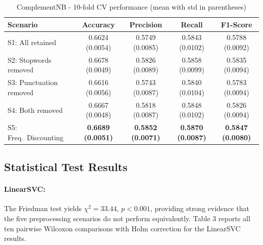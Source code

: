 \documentclass[a4paper,10pt]{article}
\begin{document}
\begin{table}[H]
\centering
\label{tab:nb_cv_results}
\begin{tabular}{|p{5.2cm}|c|c|c|c|}
\hline
\textbf{Scenario} & \textbf{Accuracy} & \textbf{Precision} & \textbf{Recall} & \textbf{F1-Score} \\
\hline
S1: All retained          & 0.6624 (0.0054) & 0.5749 (0.0085) & 0.5843 (0.0102) & 0.5788 (0.0092) \\
\hline
S2: Stopwords removed     & 0.6678 (0.0049) & 0.5826 (0.0089) & 0.5858 (0.0099) & 0.5835 (0.0094) \\
\hline
S3: Punctuation removed   & 0.6616 (0.0056) & 0.5743 (0.0087) & 0.5840 (0.0104) & 0.5783 (0.0094) \\
\hline
S4: Both removed          & 0.6667 (0.0048) & 0.5818 (0.0087) & 0.5848 (0.0102) & 0.5826 (0.0094) \\
\hline
S5: Freq.\ Discounting    & \textbf{0.6689 (0.0051)} & \textbf{0.5852 (0.0071)} & \textbf{0.5870 (0.0087)} & \textbf{0.5847 (0.0080)} \\
\hline
\end{tabular}
\caption{ComplementNB - 10-fold CV performance (mean with std in parentheses)}
\end{table}

\subsection{Statistical Test Results}

\paragraph{LinearSVC:}
The Friedman test yields $\chi^2 = 33.44$, $p < 0.001$, providing strong evidence that the five preprocessing scenarios do not perform equivalently.
Table 3 reports all ten pairwise Wilcoxon comparisons
with Holm correction for the LinearSVC results.
\end{document}
